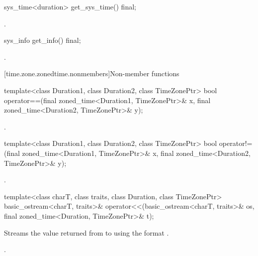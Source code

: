 %
\begin{itemdecl}
sys_time<duration> get_sys_time() final;
\end{itemdecl}

\begin{itemdescr}
\pnum
\returns {}.
\end{itemdescr}

%
\begin{itemdecl}
sys_info get_info() final;
\end{itemdecl}

\begin{itemdescr}
\pnum
\returns {}.
\end{itemdescr}

[time.zone.zonedtime.nonmembers]{Non-member functions}

%
\begin{itemdecl}
template<class Duration1, class Duration2, class TimeZonePtr>
  bool operator==(final zoned_time<Duration1, TimeZonePtr>& x,
                  final zoned_time<Duration2, TimeZonePtr>& y);
\end{itemdecl}

\begin{itemdescr}
\pnum
\returns {}.
\end{itemdescr}

%
\begin{itemdecl}
template<class Duration1, class Duration2, class TimeZonePtr>
  bool operator!=(final zoned_time<Duration1, TimeZonePtr>& x,
                  final zoned_time<Duration2, TimeZonePtr>& y);
\end{itemdecl}

\begin{itemdescr}
\pnum
\returns {}.
\end{itemdescr}

%
\begin{itemdecl}
template<class charT, class traits, class Duration, class TimeZonePtr>
  basic_ostream<charT, traits>&
    operator<<(basic_ostream<charT, traits>& os,
               final zoned_time<Duration, TimeZonePtr>& t);
\end{itemdecl}

\begin{itemdescr}
\pnum
\effects
Streams
the value returned from 
to 
using the format .

\pnum
\returns {}.
\end{itemdescr}

